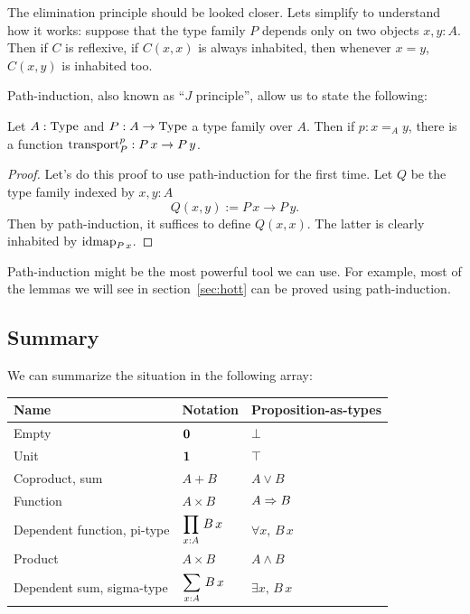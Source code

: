 The elimination principle should be looked closer. Lets simplify to
understand how it works: suppose that the type family $P$ depends only
on two objects $x,y:A$. Then if $C$ is reflexive, \ie{} if $C(x,x)$ is
always inhabited, then whenever $x=y$, $C(x,y)$ is inhabited too.

Path-induction, also known as ``$J$ principle'', allow us to state
the following:
\begin{lem}
  Let $A:\operatorname{Type}$ and $P:A\to\operatorname{Type}$ a type family over $A$. Then if
  $p:x=_A y$, there is a function $\operatorname{transport}_P^p :P\, x\to P\, y$.
\end{lem}
\begin{proof}
  Let's do this proof to use path-induction for the first time. Let
  $Q$ be the type family indexed by $x,y:A$ 
  \[ Q(x,y) := P\, x \to P\, y. \]
  Then by path-induction, it suffices to define $Q(x,x)$. The latter
  is clearly inhabited by $\operatorname{\mathrm{idmap}}_{P\, x}$.
\end{proof}

Path-induction might be the most powerful tool we can use. For
example, most of the lemmas we will see in section~\ref{sec:hott} can
be proved using path-induction.

\subsection{Summary}
\label{ssec:mltt_summary}

We can summarize the situation in the following array:

\renewcommand{\arraystretch}{2}
\begin{tabular}{|l|l|l|}
  \hline
  Name & Notation & Proposition-as-types \\
  \hline\hline
  Empty & $\displaystyle{\mathbf{0}}$ & $\displaystyle{\bot}$ \\
  \hline
  Unit & $\displaystyle{\mathbf{1}}$ & $\displaystyle{\top}$ \\
  \hline
  Coproduct, sum & $\displaystyle{A+B}$ & $\displaystyle{A\lor B}$ \\
  \hline
  Function & $\displaystyle{A\times B}$ & $\displaystyle{A\Rightarrow B}$ \\
  \hline
  Dependent function, pi-type & $\displaystyle{\prod_{x:A}\, B\, x}$ & $\displaystyle{\forall x,\,
                                                       B\, x}$ \\
  \hline
  Product & $\displaystyle{A\times B}$ & $\displaystyle{A\land B}$ \\
  \hline
  Dependent sum, sigma-type & $\displaystyle{\sum_{x:A}\, B\, x}$ & $\displaystyle{\exists x,\, B\,
                                                    x}$ \\
  \hline
\end{tabular}
\renewcommand{\arraystretch}{1}


